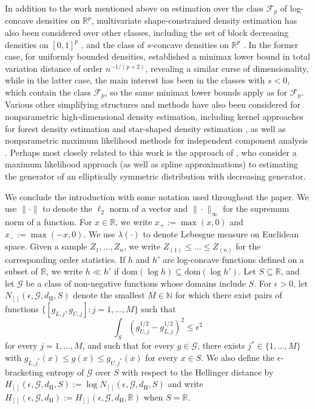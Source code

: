 \documentclass[a4paper,12pt]{article}
\begin{document}
In addition to the work mentioned above on estimation over the class $\mathcal{F}_p$ of log-concave densities on $\mathbb{R}^p$, multivariate shape-constrained density estimation has also been considered over other classes, including the set of block decreasing densities on $[0,1]^p$ \citep{polonik1995density,polonik1998silhouette,biau2003risk,gao2007entropy}, and the class of $s$-concave densities on $\mathbb{R}^p$ \citep{doss2016global,han2016approximation}.  In the former case, for uniformly bounded densities, \citet{biau2003risk} established a minimax lower bound in total variation distance of order $n^{-1/(p+2)}$, revealing a similar curse of dimensionality, while in the latter case, the main interest has been in the classes with $s < 0$, which contain the class $\mathcal{F}_p$, so the same minimax lower bounds apply as for $\mathcal{F}_p$.  Various other simplifying structures and methods have also been considered for nonparametric high-dimensional density estimation, including kernel approaches for forest density estimation \citep{liu2011forest} and star-shaped density estimation \citep{liebscher2016estimation}, as well as nonparametric maximum likelihood methods for independent component analysis \citep{samworth2012independent}.  Perhaps most closely related to this work is the approach of \citet{bhattacharya2012adaptive}, who consider a maximum likelihood approach (as well as spline approximations) to estimating the generator of an elliptically symmetric distribution with decreasing generator.

We conclude the introduction with some notation used throughout the paper.  We use $\| \cdot \|$ to denote the $\ell_2$ norm of a vector and $\|\cdot\|_\infty$ for the supremum norm of a function.  For $x \in \mathbb{R}$, we write $x_+ := \max(x, 0)$ and $x_- := \max(-x, 0)$. We use $\lambda(\cdot)$ to denote Lebesgue measure on Euclidean space.  Given a sample $Z_1,\ldots, Z_n$, we write $Z_{(1)} \leq \ldots \leq Z_{(n)}$ for the corresponding order statistics.  If $h$ and $h'$ are log-concave functions defined on a subset of $\mathbb{R}$, we write $h \ll h'$ if $\mathrm{dom}(\log h) \subseteq \mathrm{dom}(\log h')$.  Let $S \subseteq \mathbb{R}$, and let $\mathcal{G}$ be a class of non-negative functions whose domains include $S$. For $\epsilon > 0$, let $N_{[]}(\epsilon, \mathcal{G}, d_{\mathrm{H}},S)$ denote the smallest $M \in \mathbb{N}$ for which there exist pairs of functions $\{[g_{L, j}, g_{U, j}]: j = 1, \dots, M\}$ such that     
  \begin{equation*}
    \int_S (g_{U, j}^{1/2} - g_{L, j}^{1/2})^2 \leq \epsilon^2  
  \end{equation*}
for every $j=1,\ldots,M$, and such that for every $g \in \mathcal{G}$, there exists $j^* \in \{1,\ldots,M\}$ with $g_{L, j^*}(x) \leq g(x) \leq g_{U, j^*}(x)$ for every $x \in S$.  We also define the $\epsilon$-bracketing entropy of $\mathcal{G}$ over $S$ with respect to the Hellinger distance by $H_{[]}(\epsilon, \mathcal{G}, d_{\mathrm{H}},S) := \log N_{[]}(\epsilon, \mathcal{G}, d_{\mathrm{H}},S)$ and write $H_{[]}(\epsilon, \mathcal{G}, d_{\mathrm{H}}) := H_{[]}(\epsilon, \mathcal{G}, d_{\mathrm{H}},\mathbb{R})$ when $S = \mathbb{R}$.  
\end{document}
